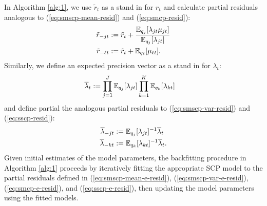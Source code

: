 In Algorithm \ref{alg:1}, we use $\tilde{r}_t$ as a stand in for $r_t$ and calculate partial residuals analogous to (\ref{eq:smscp-mean-resid}) and (\ref{eq:smcp-resid}):
\begin{align}
    \tilde{r}_{-jt} &:= \tilde{r}_t + \frac{\mathbb{E}_{q_j}[\lambda_{jt} \mu_{jt}]}{\mathbb{E}_{q_j}[\lambda_{jt}]} \label{eq:smscp-mean-e-resid} \\
    \tilde{r}_{-\ell t} &:= \tilde{r}_t + \mathbb{E}_{q_\ell}[\mu_{\ell t}]. \label{eq:smcp-e-resid} 
\end{align}
Similarly, we define an expected precision vector as a stand in for $\lambda_t$:
\begin{align}\label{eq:lambda-bar}
    \overline{\lambda}_t &:= \prod_{j=1}^J \mathbb{E}_{q_j}[\lambda_{jt}] \prod_{k=1}^K \mathbb{E}_{q_k}[\lambda_{kt}]
\end{align}
and define partial the analogous partial residuals to (\ref{eq:smscp-var-resid}) and (\ref{eq:sscp-resid}):
\begin{align}
    \overline{\lambda}_{-jt} &:= \mathbb{E}_{q_j}[\lambda_{jt}]^{-1}\overline{\lambda}_{t} \label{eq:smscp-var-e-resid}  \\
    \overline{\lambda}_{-kt} &:= \mathbb{E}_{q_k}[\lambda_{kt}]^{-1}\overline{\lambda}_{t}. \label{eq:sscp-e-resid}
\end{align}
Given initial estimates of the model parameters, the backfitting procedure in Algorithm \ref{alg:1} proceeds by iteratively fitting the appropriate SCP model to the partial residuals defined in (\ref{eq:smscp-mean-e-resid}), (\ref{eq:smscp-var-e-resid}), (\ref{eq:smcp-e-resid}), and (\ref{eq:sscp-e-resid}), then updating the model parameters using the fitted models.


